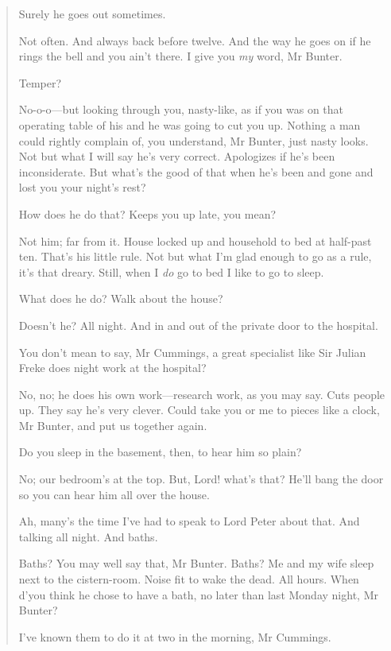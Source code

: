 \begin{quotation}
\begin{dialogue}
 Surely he goes out sometimes.

 Not often. And always back before twelve. And the way he goes on if he rings the bell and you ain't there. I give you \textit{my} word, Mr Bunter.

 Temper?

 No-o-o\allowbreak---\allowbreak but looking through you, nasty-like, as if you was on that operating table of his and he was going to cut you up. Nothing a man could rightly complain of, you understand, Mr Bunter, just nasty looks. Not but what I will say he's very correct. Apologizes if he's been inconsiderate. But what's the good of that when he's been and gone and lost you your night's rest?

 How does he do that? Keeps you up late, you mean?

 Not him; far from it. House locked up and household to bed at half-past ten. That's his little rule. Not but what I'm glad enough to go as a rule, it's that dreary. Still, when I \textit{do} go to bed I like to go to sleep.

 What does he do? Walk about the house?

 Doesn't he? All night. And in and out of the private door to the hospital.

 You don't mean to say, Mr Cummings, a great specialist like Sir Julian Freke does night work at the hospital?

 No, no; he does his own work\allowbreak---\allowbreak research work, as you may say. Cuts people up. They say he's very clever. Could take you or me to pieces like a clock, Mr Bunter, and put us together again.

 Do you sleep in the basement, then, to hear him so plain?

 No; our bedroom's at the top. But, Lord! what's that? He'll bang the door so you can hear him all over the house.

 Ah, many's the time I've had to speak to Lord Peter about that. And talking all night. And baths.

 Baths? You may well say that, Mr Bunter. Baths? Me and my wife sleep next to the cistern-room. Noise fit to wake the dead. All hours. When d'you think he chose to have a bath, no later than last Monday night, Mr Bunter?

 I've known them to do it at two in the morning, Mr Cummings.


\end{dialogue}
\end{quotation}

